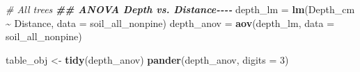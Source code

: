 \documentclass[
]{article}
\newenvironment{Shaded}{\begin{snugshade}}{\end{snugshade}}
\newcommand{\AttributeTok}[1]{\textcolor[rgb]{0.13,0.29,0.53}{#1}}
\newcommand{\CommentTok}[1]{\textcolor[rgb]{0.56,0.35,0.01}{\textit{#1}}}
\newcommand{\DecValTok}[1]{\textcolor[rgb]{0.00,0.00,0.81}{#1}}
\newcommand{\DocumentationTok}[1]{\textcolor[rgb]{0.56,0.35,0.01}{\textbf{\textit{#1}}}}
\newcommand{\FunctionTok}[1]{\textcolor[rgb]{0.13,0.29,0.53}{\textbf{#1}}}
\newcommand{\NormalTok}[1]{#1}
\newcommand{\OtherTok}[1]{\textcolor[rgb]{0.56,0.35,0.01}{#1}}
\newcommand{\SpecialCharTok}[1]{\textcolor[rgb]{0.81,0.36,0.00}{\textbf{#1}}}
\begin{document}
\begin{Shaded}
\begin{Highlighting}[]
\CommentTok{\# All trees}
\DocumentationTok{\#\# ANOVA Depth vs. Distance{-}{-}{-}{-}}
\NormalTok{depth\_lm }\OtherTok{=} \FunctionTok{lm}\NormalTok{(Depth\_cm }\SpecialCharTok{\textasciitilde{}}\NormalTok{ Distance, }\AttributeTok{data =}\NormalTok{ soil\_all\_nonpine)}
\NormalTok{depth\_anov }\OtherTok{=} \FunctionTok{aov}\NormalTok{(depth\_lm, }\AttributeTok{data =}\NormalTok{ soil\_all\_nonpine)}

\NormalTok{table\_obj }\OtherTok{\textless{}{-}} \FunctionTok{tidy}\NormalTok{(depth\_anov)}
\FunctionTok{pander}\NormalTok{(depth\_anov, }\AttributeTok{digits =} \DecValTok{3}\NormalTok{)}
\end{Highlighting}
\end{Shaded}
\end{document}
